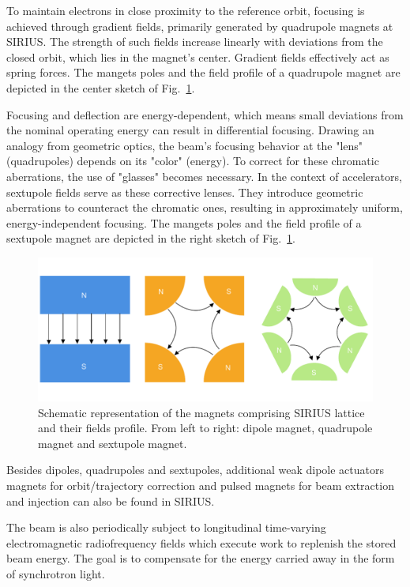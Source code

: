 To maintain electrons in close proximity to the reference orbit, focusing is achieved through gradient fields, primarily generated by quadrupole magnets at SIRIUS. The strength of such fields increase linearly with deviations from the closed orbit, which lies in the magnet's center. Gradient fields effectively act as spring forces. The mangets poles and the field profile of a quadrupole magnet are depicted in the center sketch of Fig.~\ref{fig:magnets_fields}.

Focusing and deflection are energy-dependent, which means small deviations from the nominal operating energy can result in differential focusing. Drawing an analogy from geometric optics, the beam's focusing behavior at the "lens" (quadrupoles) depends on its "color" (energy). To correct for these chromatic aberrations, the use of "glasses" becomes necessary. In the context of accelerators, sextupole fields serve as these corrective lenses. They introduce geometric aberrations to counteract the chromatic ones, resulting in approximately uniform, energy-independent focusing. The mangets poles and the field profile of a sextupole magnet are depicted in the right sketch of Fig.~\ref{fig:magnets_fields}.
\begin{figure}[htb]
    \includegraphics[width=\textwidth]{Images/magnets.pdf}
    \caption{Schematic representation of the magnets comprising SIRIUS lattice and their fields profile. From left to right: dipole magnet, quadrupole magnet and sextupole magnet.}
    \label{fig:magnets_fields}
\end{figure}
Besides dipoles, quadrupoles and sextupoles, additional weak dipole actuators magnets for orbit/trajectory correction and pulsed magnets for beam extraction and injection can also be found in SIRIUS.

The beam is also periodically subject to longitudinal time-varying electromagnetic radiofrequency fields which execute work to replenish the stored beam energy. The goal is to compensate for the energy carried away in the form of synchrotron light.

